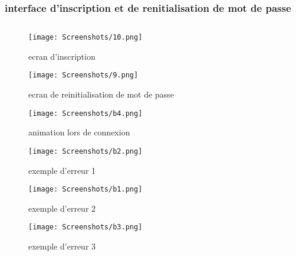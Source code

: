   \subsubsection{interface d'inscription et de renitialisation de mot de passe}
  $ $
  \begin{figure}[!htbp]
    \begin{minipage}[t]{0.4\textwidth}    %
            \texttt{[image: Screenshots/10.png]}
            \caption{ ecran d'inscription}
    \end{minipage}%
    \begin{minipage}{0.20\textwidth}
      \hfill
    \end{minipage}
  \begin{minipage}[t]{0.4\textwidth}
          \texttt{[image: Screenshots/9.png]}
          \caption{ ecran de reinitialisation de mot de passe}
  \end{minipage}%
    \end{figure}
\begin{figure}[!htbp]
      \begin{minipage}[t]{0.4\textwidth}    %
              \texttt{[image: Screenshots/b4.png]}
              \caption{ animation lors de connexion}
      \end{minipage}%
      \begin{minipage}{0.20\textwidth}
        \hfill
      \end{minipage}
    \begin{minipage}[t]{0.4\textwidth}
            \texttt{[image: Screenshots/b2.png]}
            \caption{ exemple d'erreur 1}
    \end{minipage}%
      \end{figure}
      \begin{figure}[!htbp]
        \begin{minipage}[t]{0.4\textwidth}    %
                \texttt{[image: Screenshots/b1.png]}
                \caption{ exemple d'erreur 2}
        \end{minipage}%
        \begin{minipage}{0.20\textwidth} 
          \hfill
        \end{minipage}
      \begin{minipage}[t]{0.4\textwidth}
              \texttt{[image: Screenshots/b3.png]}
              \caption{ exemple d'erreur 3}
      \end{minipage}%
        \end{figure}
\newpage
